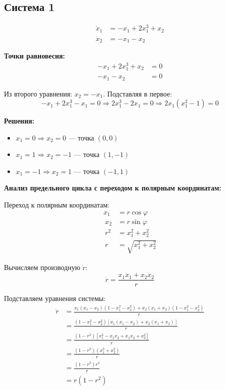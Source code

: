 \subsection*{Система 1}

\begin{align}
\dot{x}_1 &= -x_1 + 2x_1^3 + x_2 \\
\dot{x}_2 &= -x_1 - x_2
\end{align}

\textbf{Точки равновесия:}
\begin{align}
-x_1 + 2x_1^3 + x_2 &= 0 \\
-x_1 - x_2 &= 0
\end{align}

Из второго уравнения: $x_2 = -x_1$. Подставляя в первое:
$$-x_1 + 2x_1^3 - x_1 = 0 \Rightarrow 2x_1^3 - 2x_1 = 0 \Rightarrow 2x_1(x_1^2 - 1) = 0$$

\textbf{Решения:}
\begin{itemize}
\item $x_1 = 0 \Rightarrow x_2 = 0$ --- точка $(0, 0)$
\item $x_1 = 1 \Rightarrow x_2 = -1$ --- точка $(1, -1)$
\item $x_1 = -1 \Rightarrow x_2 = 1$ --- точка $(-1, 1)$
\end{itemize}

\textbf{Анализ предельного цикла с переходом к полярным координатам:}

Переход к полярным координатам:
\begin{align}
x_1 &= r\cos\varphi \\\
x_2 &= r\sin\varphi \\\
r^2 &= x_1^2 + x_2^2 \\\
r &= \sqrt{x_1^2 + x_2^2}
\end{align}

Вычисляем производную $\dot{r}$:
$$\dot{r} = \frac{x_1\dot{x}_1 + x_2\dot{x}_2}{r}$$

Подставляем уравнения системы:
\begin{align}
\dot{r} &= \frac{x_1(x_1 - x_2)(1 - x_1^2 - x_2^2) + x_2(x_1 + x_2)(1 - x_1^2 - x_2^2)}{r} \\\
&= \frac{(1 - x_1^2 - x_2^2)[x_1(x_1 - x_2) + x_2(x_1 + x_2)]}{r} \\\
&= \frac{(1 - r^2)[x_1^2 - x_1x_2 + x_1x_2 + x_2^2]}{r} \\\
&= \frac{(1 - r^2)(x_1^2 + x_2^2)}{r} \\\
&= \frac{(1 - r^2)r^2}{r} \\\
&= r(1 - r^2)
\end{align}

